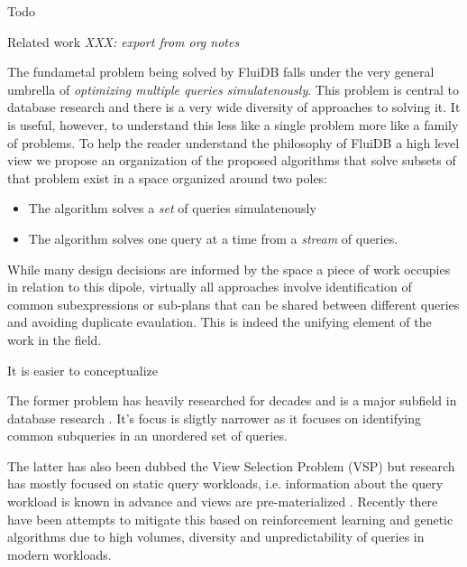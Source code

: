 
\begin{summary}
\item Todo
\end{summary}

\begin{correction}{Related work}
  \emph{XXX: export from org notes}
\end{correction}

The fundametal problem being solved by FluiDB falls under the very
general umbrella of \emph{optimizing multiple queries simulatenously}. This
problem is central to database research and there is a very wide
diversity of approaches to solving it. It is useful, however, to
understand this less like a single problem more like a family of
problems. To help the reader understand the philosophy of FluiDB a
high level view we propose an organization of the proposed algorithms
that solve subsets of that problem exist in a space organized around
two poles:

\begin{itemize}
\item The algorithm solves a \emph{set} of queries simulatenously
\item The algorithm solves one query at a time from a \emph{stream} of queries.
\end{itemize}

While many design decisions are informed by the space a piece of work
occupies in relation to this dipole, virtually all approaches involve
identification of common subexpressions or sub-plans that can be
shared between different queries and avoiding duplicate
evaulation. This is indeed the unifying element of the work in the
field.

It is easier to conceptualize

The former problem has heavily researched for decades and is a major
 subfield in database research
 \cite{sellisMultipleQueryOptimization1987,royEfficientExtensibleAlgorithms2000,ComputingQueriesDerived}. It's
 focus is sligtly narrower as it focuses on identifying common
 subqueries in an unordered set of queries.

The latter has also been dubbed the View Selection Problem (VSP) but
research has mostly focused on static query workloads,
i.e. information about the query workload is known in advance and
views are pre-materialized
\cite{phanDynamicMaterializationQuery2008a}. Recently there have been
attempts to mitigate this based on reinforcement learning and genetic
algorithms due to high volumes, diversity and unpredictability of
queries in modern workloads.

